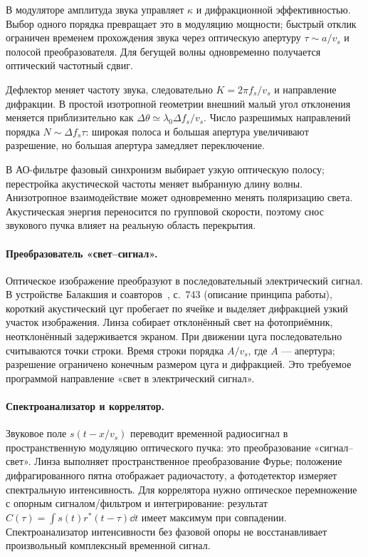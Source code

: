 
В модуляторе амплитуда звука управляет $\kappa$ и дифракционной эффективностью. Выбор одного порядка превращает это в модуляцию мощности; быстрый отклик ограничен временем прохождения звука через оптическую апертуру $\tau\sim a/v_s$ и полосой преобразователя. Для бегущей волны одновременно получается оптический частотный сдвиг.

Дефлектор меняет частоту звука, следовательно $K=2\pi f_s/v_s$ и направление дифракции. В простой изотропной геометрии внешний малый угол отклонения меняется приблизительно как $\Delta\theta\simeq\lambda_0\Delta f_s/v_s$. Число разрешимых направлений порядка $N\sim\Delta f_s\tau$: широкая полоса и большая апертура увеличивают разрешение, но большая апертура замедляет переключение.

В АО-фильтре фазовый синхронизм выбирает узкую оптическую полосу; перестройка акустической частоты меняет выбранную длину волны. Анизотропное взаимодействие может одновременно менять поляризацию света. Акустическая энергия переносится по групповой скорости, поэтому снос звукового пучка влияет на реальную область перекрытия.


\paragraph{Преобразователь «свет--сигнал».}
Оптическое изображение преобразуют в последовательный электрический сигнал. В устройстве Балакшия и соавторов~\cite{balakshylightsignal}, с.~743 (описание принципа работы), короткий акустический цуг пробегает по ячейке и выделяет дифракцией узкий участок изображения. Линза собирает отклонённый свет на фотоприёмник, неотклонённый задерживается экраном. При движении цуга последовательно считываются точки строки. Время строки порядка $A/v_s$, где $A$ --- апертура; разрешение ограничено конечным размером цуга и дифракцией. Это требуемое программой направление «свет в электрический сигнал».

\paragraph{Спектроанализатор и коррелятор.}
Звуковое поле $s(t-x/v_s)$ переводит временной радиосигнал в пространственную модуляцию оптического пучка: это преобразование «сигнал–свет». Линза выполняет пространственное преобразование Фурье; положение дифрагированного пятна отображает радиочастоту, а фотодетектор измеряет спектральную интенсивность. Для коррелятора нужно оптическое перемножение с опорным сигналом/фильтром и интегрирование: результат $C(\tau)=\int s(t)r^*(t-\tau)\dd t$ имеет максимум при совпадении. Спектроанализатор интенсивности без фазовой опоры не восстанавливает произвольный комплексный временной сигнал.
